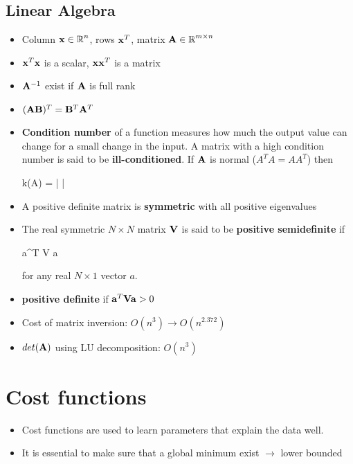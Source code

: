 \subsection{Linear Algebra}
\begin{itemize}
\item Column $\mathbf{x} \in \operatorname{\mathbb{R}}^n$, rows $\mathbf{x}^T$, matrix $\mathbf{A} \in \operatorname{\mathbb{R}}^{m \times n}$

\item $\mathbf{x}^T \mathbf{x}$ is a scalar, $\mathbf{x} \mathbf{x}^T$ is a matrix

\item $\mathbf{A}^{-1}$ exist if $\mathbf{A}$ is full rank

\item $(\mathbf{A} \mathbf{B})^T = \mathbf{B}^T \mathbf{A}^T$

\item \textbf{Condition number} of a function measures how much the output value can change for a small change in the input. A matrix with a high condition number is said to be \textbf{ill-conditioned}. If $\mathbf{A}$ is normal ($A^T A = A A^T$) then
\begin{myalign*}
    k(\*A) = 
    \left|
    \right|
\end{myalign*}

\item A positive definite matrix is \textbf{symmetric} with all positive eigenvalues
\item The real symmetric $N \times N$ matrix $\mathbf{V}$ is said to be \textbf{positive semidefinite} if 
\begin{myalign*}
    \*a^T \*V \*a 
\end{myalign*}
for any real $N \times 1$ vector $a$.
\item \textbf{positive definite} if $\mathbf{a}^T \mathbf{V} \mathbf{a} > 0$
\item Cost of matrix inversion: $O(n^3) \rightarrow O(n^{2.372})$
\item $det(\mathbf{A})$ using LU decomposition: $O(n^3)$

\end{itemize}

\section{Cost functions}
\begin{itemize}
    \item Cost functions are used to learn parameters that explain the data well.
    \item It is essential to make sure that a global minimum exist $\rightarrow$ lower bounded
\end{itemize}

